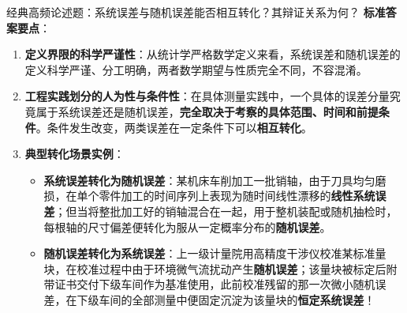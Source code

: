 \documentclass[11pt,a4paper]{ctexart}
\begin{document}
\begin{exambox}{经典高频论述题：系统误差与随机误差能否相互转化？其辩证关系为何？}
\textbf{标准答案要点}：
\begin{enumerate}
    \item \textbf{定义界限的科学严谨性}：从统计学严格数学定义来看，系统误差和随机误差的定义科学严谨、分工明确，两者数学期望与性质完全不同，不容混淆。
    \item \textbf{工程实践划分的人为性与条件性}：在具体测量实践中，一个具体的误差分量究竟属于系统误差还是随机误差，\textbf{完全取决于考察的具体范围、时间和前提条件}。条件发生改变，两类误差在一定条件下可以\textbf{相互转化}。
    \item \textbf{典型转化场景实例}：
    \begin{itemize}
        \item \textbf{系统误差转化为随机误差}：某机床车削加工一批销轴，由于刀具均匀磨损，在单个零件加工的时间序列上表现为随时间线性漂移的\textbf{线性系统误差}；但当将整批加工好的销轴混合在一起，用于整机装配或随机抽检时，每根轴的尺寸偏差便转化为服从一定概率分布的\textbf{随机误差}。
        \item \textbf{随机误差转化为系统误差}：上一级计量院用高精度干涉仪校准某标准量块，在校准过程中由于环境微气流扰动产生\textbf{随机误差}；该量块被标定后附带证书交付下级车间作为基准使用，此前校准残留的那一次微小随机误差，在下级车间的全部测量中便固定沉淀为该量块的\textbf{恒定系统误差}！
    \end{itemize}
\end{enumerate}
\end{exambox}
\end{document}
